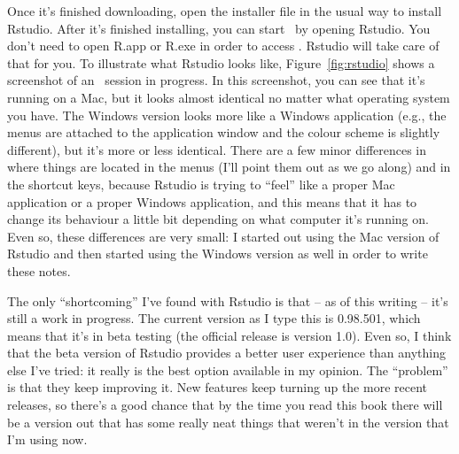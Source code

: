 Once it's finished downloading, open the installer file in the usual way to install Rstudio. After it's finished installing, you can start \R\ by opening Rstudio.  You don't need to open R.app or R.exe in order to access \R. Rstudio will take care of that for you. To illustrate what Rstudio looks like, Figure~\ref{fig:rstudio} shows a screenshot of an \R\ session in progress. In this screenshot, you can see that it's running on a Mac, but it looks almost identical no matter what operating system you have. The Windows version looks more like a Windows application (e.g., the menus are attached to the application window and the colour scheme is slightly different), but it's more or less identical. There are a few minor differences in where things are located in the menus (I'll point them out as we go along) and in the shortcut keys, because Rstudio is trying to ``feel'' like a proper Mac application or a proper Windows application, and this means that it has to change its behaviour a little bit depending on what computer it's running on. Even so, these differences are very small: I started out using the Mac version of Rstudio and then started using the Windows version as well in order to write these notes.

The only ``shortcoming'' I've found with Rstudio is that -- as of this writing -- it's still a work in progress. The current version as I type this is 0.98.501, which means that it's in beta testing (the official release is version 1.0). Even so, I think that the beta version of Rstudio provides a better user experience than anything else I've tried: it really is the best option available in my opinion. The ``problem'' is that they keep improving it. New features keep turning up the more recent releases, so there's a good chance that by the time you read this book there will be a version out that has some really neat things that weren't in the version that I'm using now.


